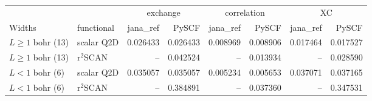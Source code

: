 \begin{tabular}{@{}llrrrrrr@{}}
\toprule
 & & \multicolumn{2}{c}{exchange} & \multicolumn{2}{c}{correlation} & \multicolumn{2}{c}{XC} \\
\cmidrule(lr){3-4}\cmidrule(lr){5-6}\cmidrule(lr){7-8}
Widths & functional & jana\_ref & PySCF & jana\_ref & PySCF & jana\_ref & PySCF \\
\midrule
$L \geq 1$ bohr (13) & scalar Q2D & 0.026433 & \textcolor{pyscfred}{0.026433} & 0.008969 & \textcolor{pyscfred}{0.008906} & 0.017464 & \textcolor{pyscfred}{0.017527} \\
$L \geq 1$ bohr (13) & r$^2$SCAN & -- & \textcolor{pyscfred}{0.042524} & -- & \textcolor{pyscfred}{0.013934} & -- & \textcolor{pyscfred}{0.028590} \\
$L < 1$ bohr (6) & scalar Q2D & 0.035057 & \textcolor{pyscfred}{0.035057} & 0.005234 & \textcolor{pyscfred}{0.005653} & 0.037071 & \textcolor{pyscfred}{0.037165} \\
$L < 1$ bohr (6) & r$^2$SCAN & -- & \textcolor{pyscfred}{0.384891} & -- & \textcolor{pyscfred}{0.037360} & -- & \textcolor{pyscfred}{0.347531} \\
\bottomrule
\end{tabular}
